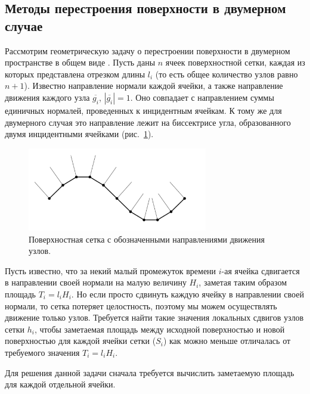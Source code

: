 \subsection{Методы перестроения поверхности в двумерном случае}

Рассмотрим геометрическую задачу о перестроении поверхности в двумерном пространстве в общем виде \cite{Rybakov2019Geo2D}.
Пусть даны $n$ ячеек поверхностной сетки, каждая из которых представлена отрезком длины $l_i$ (то есть общее количество узлов равно $n + 1$).
Известно направление нормали каждой ячейки, а также направление движения каждого узла $\overline{g_i}$, $|\overline{g_i}| = 1$.
Оно совпадает с направлением суммы единичных нормалей, проведенных к инцидентным ячейкам.
К тому же для двумерного случая это направление лежит на биссектрисе угла, образованного двумя инцидентными ячейками \cite{Fortin2004Remesh2d} (рис.~\ref{fig:text_1_remesh_2d_grid_normals}).

\begin{figure}[h]
\onelinecaptionstrue
\centering
\includegraphics[width=0.7\textwidth]{pics/text_1_remesh_2d/grid_normals.pdf}
\caption{Поверхностная сетка с обозначенными направлениями движения узлов.}
\label{fig:text_1_remesh_2d_grid_normals}
\end{figure}

Пусть известно, что за некий малый промежуток времени $i$-ая ячейка сдвигается в направлении своей нормали на малую величину $H_i$, заметая таким образом площадь $T_i = l_i H_i$.
Но если просто сдвинуть каждую ячейку в направлении своей нормали, то сетка потеряет целостность, поэтому мы можем осуществлять движение только узлов.
Требуется найти такие значения локальных сдвигов узлов сетки $h_i$, чтобы заметаемая площадь между исходной поверхностью и новой поверхностью для каждой ячейки сетки ($S_i$) как можно меньше отличалась от требуемого значения $T_i = l_iH_i$.

Для решения данной задачи сначала требуется вычислить заметаемую площадь для каждой отдельной ячейки.

